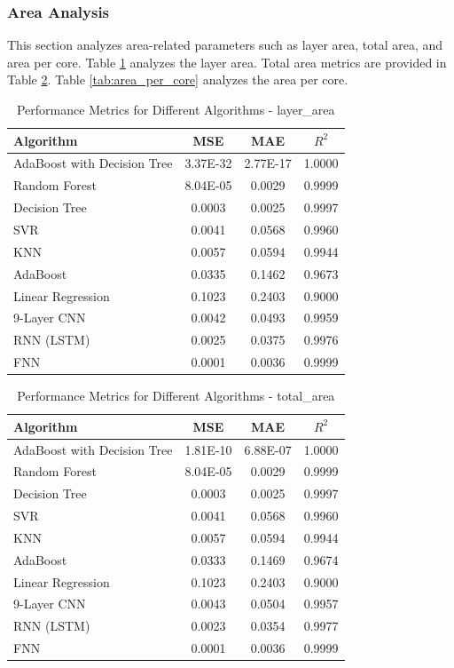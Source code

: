 \documentclass[conference]{IEEEtran}
\begin{document}
	\subsubsection{Area Analysis}
	This section analyzes area-related parameters such as layer area, total area, and area per core. Table \ref{tab:layer_area} analyzes the layer area. Total area metrics are provided in Table \ref{tab:total_area}. Table \ref{tab:area_per_core} analyzes the area per core.

\begin{table}[htbp]
	\caption{Performance Metrics for Different Algorithms - layer\_area}
	\label{tab:layer_area}
	\begin{tabular}{lccc}
		\toprule
		\textbf{Algorithm} & \textbf{MSE} & \textbf{MAE} & \textbf{\(R^2\)} \\
		\midrule
		AdaBoost with Decision Tree & 3.37E-32 & 2.77E-17 & 1.0000 \\
		Random Forest & 8.04E-05 & 0.0029 & 0.9999 \\
		Decision Tree & 0.0003 & 0.0025 & 0.9997 \\
		SVR & 0.0041 & 0.0568 & 0.9960 \\
		KNN & 0.0057 & 0.0594 & 0.9944 \\
		AdaBoost & 0.0335 & 0.1462 & 0.9673 \\
		Linear Regression & 0.1023 & 0.2403 & 0.9000 \\
		9-Layer CNN                & 0.0042       & 0.0493       & 0.9959      \\ 
		RNN (LSTM)  & 0.0025       & 0.0375       & 0.9976      \\ 
		FNN                & 0.0001       & 0.0036       & 0.9999      \\ 
		\bottomrule
	\end{tabular}
\end{table}

\begin{table}[htbp]
	\caption{Performance Metrics for Different Algorithms - total\_area}
	\label{tab:total_area}
	\begin{tabular}{lccc}
		\toprule
		\textbf{Algorithm} & \textbf{MSE} & \textbf{MAE} & \textbf{\(R^2\)} \\
		\midrule
		AdaBoost with Decision Tree & 1.81E-10 & 6.88E-07 & 1.0000 \\
		Random Forest & 8.04E-05 & 0.0029 & 0.9999 \\
		Decision Tree & 0.0003 & 0.0025 & 0.9997 \\
		SVR & 0.0041 & 0.0568 & 0.9960 \\
		KNN & 0.0057 & 0.0594 & 0.9944 \\
		AdaBoost & 0.0333 & 0.1469 & 0.9674 \\
		Linear Regression & 0.1023 & 0.2403 & 0.9000 \\
		9-Layer CNN                & 0.0043       & 0.0504       & 0.9957      \\ 
		RNN (LSTM)  & 0.0023       & 0.0354       & 0.9977      \\ 
		FNN                & 0.0001       & 0.0036       & 0.9999      \\ 
		\bottomrule
	\end{tabular}
\end{table}
\end{document}
